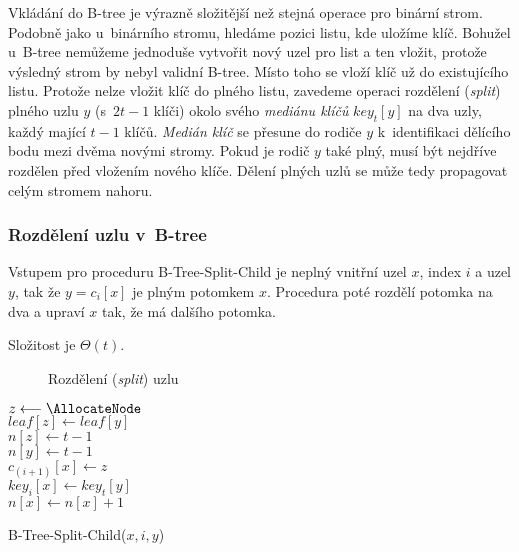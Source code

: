 Vkládání do B-tree je výrazně složitější než stejná operace pro binární
strom\@. Podobně jako u~binárního stromu, hledáme pozici listu,
kde uložíme klíč. Bohužel u~B-tree nemůžeme jednoduše vytvořit nový
uzel pro list a ten vložit, protože výsledný strom by nebyl validní
B-tree\@. Místo toho se vloží klíč už do existujícího listu\@. Protože
nelze vložit klíč do plného listu, zavedeme operaci rozdělení (\emph{split})
plného uzlu $y$ (s~$2t-1$ klíči) okolo svého \emph{mediánu klíčů}
$key_{t}[y]$ na dva uzly, každý mající $t-1$ klíčů\@. \emph{Medián
klíč} se přesune do rodiče $y$ k~identifikaci dělícího bodu mezi
dvěma novými stromy\@. Pokud je rodič $y$ také plný, musí být nejdříve
rozdělen před vložením nového klíče. Dělení plných uzlů se může tedy
propagovat celým stromem nahoru.


\subsubsection{Rozdělení uzlu v~B-tree}

Vstupem pro proceduru B-Tree-Split-Child je neplný vnitřní uzel $x$,
index $i$ a uzel $y$, tak že $y=c_{i}[x]$ je plným potomkem $x$\@.
Procedura poté rozdělí potomka na dva a upraví $x$ tak, že má dalšího
potomka.

Složitost je $\Theta(t)$\@.

\begin{figure}[t]
\caption{Rozdělení (\emph{split}) uzlu}
\end{figure}


\begin{algorithm}[t]
\SetAlgoLined
{}

{$z \longleftarrow \AllocateNode$}\\
{$leaf[z] \longleftarrow leaf[y]$}\\
{$n[z] \longleftarrow t-1$}\\
$n[y] \longleftarrow t-1$\\
$c_{(i+1)}[x] \longleftarrow z$\\
$key_i[x] \longleftarrow key_t[y]$\\
$n[x] \longleftarrow n[x]+1$
\caption{B-Tree-Split-Child($x, i, y$)}
\end{algorithm}



